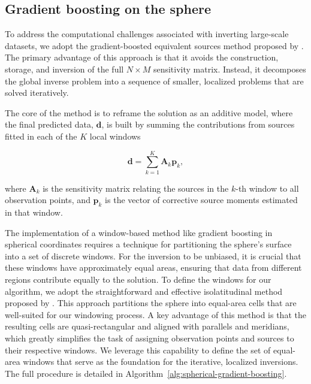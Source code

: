 \documentclass[onecolumn,10pt,a4paper]{article}
\begin{document}
\subsection{Gradient boosting on the sphere}

To address the computational challenges associated with inverting large-scale datasets, we adopt the
gradient-boosted equivalent sources method proposed by \citet{Soler2021}. The primary advantage of
this approach is that it avoids the construction, storage, and inversion of the full $N \times M$
sensitivity matrix. Instead, it decomposes the global inverse problem into a sequence of smaller,
localized problems that are solved iteratively.

The core of the method is to reframe the solution as an additive model, where the final predicted
data, $\mathbf{d}$, is built by summing the contributions from sources fitted in each of the $K$
local windows

\begin{equation}
    \mathbf{d} = \sum_{k=1}^{K} \mathbf{A}_k \mathbf{p}_k,
\end{equation}

\noindent
where $\mathbf{A}_k$ is the sensitivity matrix relating the sources in the $k$-th window to all
observation points, and $\mathbf{p}_k$ is the vector of corrective source moments estimated in that
window.

The implementation of a window-based method like gradient boosting in spherical coordinates requires
a technique for partitioning the sphere's surface into a set of discrete windows. For the inversion
to be unbiased, it is crucial that these windows have approximately equal areas, ensuring that data
from different regions contribute equally to the solution. To define the windows for our algorithm,
we adopt the straightforward and effective isolatitudinal method proposed by \citet{Malkin2016}.
This approach partitions the sphere into equal-area cells that are well-suited for our windowing process.
A key advantage of this method is that the resulting cells are quasi-rectangular and aligned with parallels
and meridians, which greatly simplifies the task of assigning observation points and sources to
their respective windows. We leverage this capability to define the set of equal-area windows that
serve as the foundation for the iterative, localized inversions. The full procedure is detailed in
Algorithm~\ref{alg:spherical-gradient-boosting}.
\end{document}
